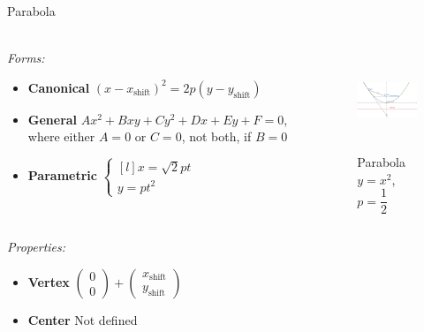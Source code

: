 \documentclass[aspectratio=169]{beamer}
\newcommand{\shf}{\text{shift}}
\begin{document}
\begin{frame}[t]{Parabola}
\framesubtitle{}
    \scriptsize
    \vspace{-0.4cm}
\begin{columns}[T,onlytextwidth]
    \begin{column}{0.59\textwidth}
        \textit{Forms:} \\
\begin{itemize}
    \item \textbf{Canonical} $(x-x_{\shf})^2=2p(y-y_{\shf})$
    \item \textbf{General} $Ax^2+Bxy+Cy^2+Dx+Ey+F=0$, where either $A=0$ or $C=0$, not both, if $B=0$
    \item \textbf{Parametric} $\left\{\begin{matrix*}[l] x = \sqrt{2}pt\\ y = pt^2\end{matrix*}\right.$
\end{itemize}
    \end{column}
    \begin{column}{0.39\textwidth}
        \begin{figure}[H]
            \centering\includegraphics[height=3cm,width=1\textwidth,keepaspectratio]{Parabola.png}
            \vspace{-0.5cm}
            \caption*{\scriptsize Parabola $y=x^2$, $p=\dfrac{1}{2}$}
            \label{fig:Parabola.png}
        \end{figure}
    \end{column}
\end{columns}
\vspace{-0.6cm}
\textit{Properties:}
\begin{multicols}{3}
    \begin{itemize}
        \item \textbf{Vertex} $\begin{pmatrix} 0\\0 \end{pmatrix} + \begin{pmatrix} x_{\shf}\\y_{\shf} \end{pmatrix}$
        \item \textbf{Center} Not defined

\end{itemize}
\end{multicols}
\end{frame}
\end{document}
